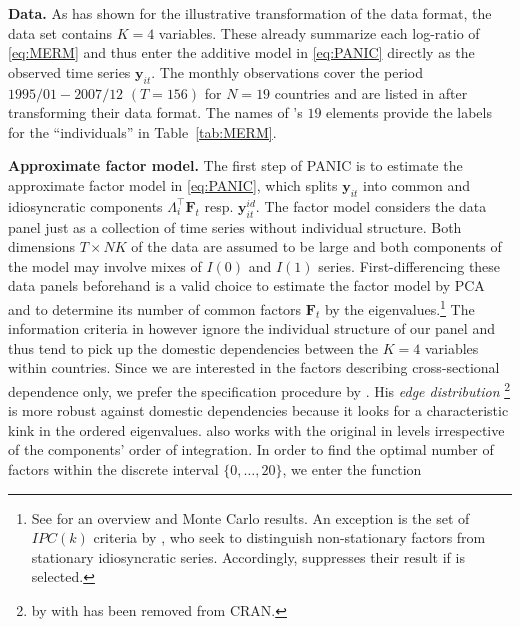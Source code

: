 \textbf{Data.} As  has shown for the illustrative transformation of the data format, the data set  contains $ K=4 $ variables. These already summarize each log-ratio of \eqref{eq:MERM} and thus enter the additive model in \eqref{eq:PANIC} directly as the observed time series $ \boldsymbol{y}_{it} $. The  monthly observations cover the period $ 1995/01 - 2007/12 $ $ (T = 156) $ for $ N = 19 $ countries and are listed in  after transforming their data format. The names of 's $ 19 $ elements provide the labels for the ``individuals'' in Table~\ref{tab:MERM}.


\textbf{Approximate factor model.} The first step of PANIC is to estimate the approximate factor model in \eqref{eq:PANIC}, which splits $ \boldsymbol{y}_{it} $ into common and idiosyncratic components $ \Lambda_i^\top \boldsymbol{F}_t $ resp. $ \boldsymbol{y}^{i \! d}_{it} $. The factor model considers the data panel just as a collection of time series without individual structure. Both dimensions $ T \times NK $ of the data are assumed to be large and both components of the model may involve mixes of $  I(0) $ and $ I(1) $ series. First-differencing these data panels beforehand is a valid choice to estimate the factor model by PCA \citep{BaiNg2004} and to determine its number of common factors $ \boldsymbol{F}_t $ by the eigenvalues.\footnote{See \cite{CoronaEtAl2017} for an overview and Monte Carlo results. An exception is the set of $ IPC(k) $ criteria by \citet{Bai2004}, who seek to distinguish non-stationary factors from stationary idiosyncratic series. Accordingly,  suppresses their result if  is selected.} The information criteria in \code{[[1]]} however ignore the individual structure of our panel and thus tend to pick up the domestic dependencies between the $ K=4 $ variables within countries. Since we are interested in the factors describing cross-sectional dependence only, we prefer the specification procedure by \cite{Onatski2010}. His \textit{edge distribution} \footnote{ by \citet{BadaLiebl2014} with  has been removed from CRAN.} is more robust against domestic dependencies because it looks for a characteristic kink in the ordered eigenvalues.  also works with the original  in levels irrespective of the components' order of integration. In order to find the optimal number of factors within the discrete interval $ \lbrace 0,\ldots,20 \rbrace $, we enter the  function 
